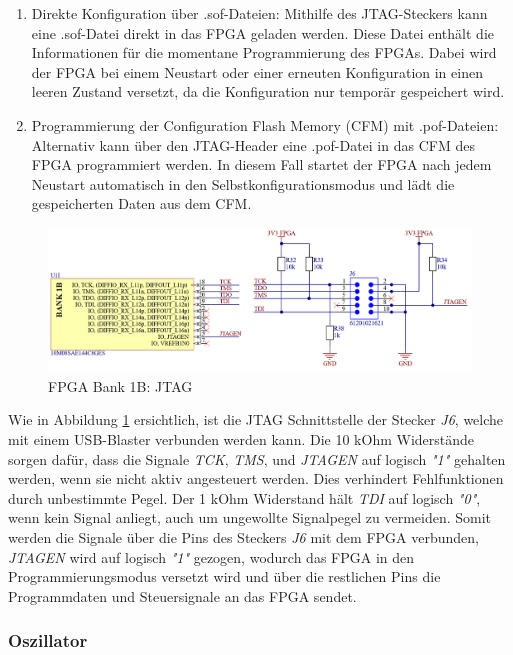 \begin{enumerate}
    \item Direkte Konfiguration über .sof-Dateien:
    Mithilfe des JTAG-Steckers kann eine .sof-Datei direkt in das FPGA geladen werden. Diese Datei enthält die Informationen für die momentane Programmierung des FPGAs. Dabei wird der FPGA bei einem Neustart oder einer erneuten Konfiguration in einen leeren Zustand versetzt, da die Konfiguration nur temporär gespeichert wird.
    \item Programmierung der Configuration Flash Memory (CFM) mit .pof-Dateien: 
    Alternativ kann über den JTAG-Header eine .pof-Datei in das CFM des FPGA programmiert werden. In diesem Fall startet der FPGA nach jedem Neustart automatisch in den Selbstkonfigurationsmodus und lädt die gespeicherten Daten aus dem CFM.
\end{enumerate}

\begin{figure}[H]
    \centering
    \includegraphics[width=1.0\linewidth]{Figures/Chap3/Schematics/Bank1B_JTAG.png}
    \caption{FPGA Bank 1B: JTAG}
    \label{FPGA JTAG}
\end{figure}

Wie in Abbildung \ref{FPGA JTAG} ersichtlich, ist die JTAG Schnittstelle der Stecker \textit{J6}, welche mit einem USB-Blaster verbunden werden kann. Die 10 kOhm Widerstände sorgen dafür, dass die Signale \textit{TCK}, \textit{TMS}, und \textit{JTAGEN} auf logisch \textit{"1"} gehalten werden, wenn sie nicht aktiv angesteuert werden. Dies verhindert Fehlfunktionen durch unbestimmte Pegel. Der 1 kOhm Widerstand hält \textit{TDI} auf logisch \textit{"0"}, wenn kein Signal anliegt, auch um ungewollte Signalpegel zu vermeiden. Somit werden die Signale über die Pins des Steckers \textit{J6} mit dem FPGA verbunden, \textit{JTAGEN} wird auf logisch \textit{"1"} gezogen, wodurch das FPGA in den Programmierungsmodus versetzt wird und über die restlichen Pins die Programmdaten und Steuersignale an das FPGA sendet.


\subsubsection{Oszillator}


